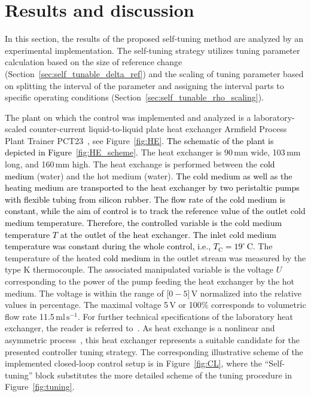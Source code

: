 \documentclass[preprint,12pt]{elsarticle}
\newcommand{\change}[1]{\textcolor{black}{#1}}
\begin{document}
	
	\section{Results and discussion}
	\label{sec:results}
	
	In this section, the results of the proposed self-tuning method are analyzed by an experimental implementation. The self-tuning strategy utilizes tuning parameter calculation based on the size of reference change (Section~\ref{sec:self_tunable_delta_ref}) and the scaling of tuning parameter based on splitting the interval of the parameter and assigning the interval parts to specific operating conditions (Section~\ref{sec:self_tunable_rho_scaling}).

	The plant on which the control was implemented and analyzed is a laboratory-scaled counter-current liquid-to-liquid plate heat exchanger Armfield Process Plant Trainer PCT23~\cite{pct23}, see Figure~\ref{fig:HE}. \change{The schematic of the plant is depicted in Figure~\ref{fig:HE_scheme}.} The heat exchanger is 90\,mm wide, 103\,mm long, and 160\,mm high. The heat exchange is performed between the \change{cold medium} (water) and the hot medium (water). \change{The cold medium as well as the heating medium are transported to the heat exchanger by two peristaltic pumps with flexible tubing from silicon rubber. The flow rate of the cold medium is constant, while the aim of control is to track the reference value of the outlet cold medium temperature. Therefore, the controlled variable is the \change{cold medium} temperature $T$ at the outlet of the heat exchanger. The inlet cold medium temperature was constant during the whole control, i.e., $T_\mathrm{C} = 19^{\circ}$\,C.} The temperature of the heated \change{cold medium} in the outlet stream was measured by the type K thermocouple. The associated manipulated variable is the voltage $U$ corresponding to the power of the pump feeding the heat exchanger by the hot medium. The voltage is within the range of [$0-5$]\,V normalized into the relative values in percentage. The maximal voltage 5\,V or 100\% corresponds to volumetric flow rate 11.5\,$\mathrm{ml}\,\mathrm{s}^{-1}$. For further technical specifications of the laboratory heat exchanger, the reader is referred to~\cite{pct23}. As heat exchange is a nonlinear and asymmetric process~\cite{Liptak}, this heat exchanger represents a suitable candidate for the presented controller tuning strategy. The corresponding illustrative scheme of the implemented closed-loop control setup is in Figure~\ref{fig:CL}, where the ``Self-tuning'' block substitutes the more detailed scheme of the tuning procedure in Figure~\ref{fig:tuning}.  
\end{document}
